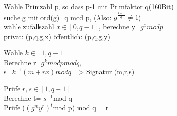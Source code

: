 Wähle Primzahl p, so dass p-1 mit Primfaktor q(160Bit) \\ 
suche g mit ord(g)=q mod p, (Also: $g^{\frac{p-1}{q}} \neq 1$)\\
wähle zufallszahl $x \in [0,q-1]$, berechne y=$g^x mod p$\\
privat: (p,q,g,x) öffentlich: (p,q,g,y)

\begin{multicols}{2}
Wähle $k \in [1,q-1]$\\
Berechne r=$g^k mod p mod q$, \\
s=$k^{-1}(m+rx)mod q$ => Signatur (m,r,s)

Prüfe $r,s \in [1,q-1]$\\
Berechne t= $s^{-1}$mod q\\
Prüfe ($(g^my^r)^t$mod p) mod q = r
\end{multicols}

\clearpage